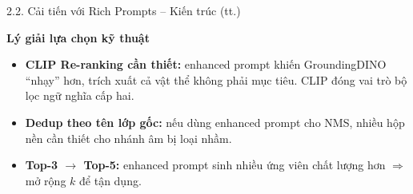 \documentclass[11pt]{beamer}
\begin{document}
\begin{frame}{2.2. Cải tiến với Rich Prompts -- Kiến trúc (tt.)}
\begin{block}{\textbf{Lý giải lựa chọn kỹ thuật}}
\begin{itemize}
  \item \textbf{CLIP Re-ranking cần thiết:} enhanced prompt khiến GroundingDINO ``nhạy'' hơn, trích xuất cả vật thể không phải mục tiêu. CLIP đóng vai trò bộ lọc ngữ nghĩa cấp hai.
  \item \textbf{Dedup theo tên lớp gốc:} nếu dùng enhanced prompt cho NMS, nhiều hộp nền cần thiết cho nhánh âm bị loại nhầm.
  \item \textbf{Top-3 $\to$ Top-5:} enhanced prompt sinh nhiều ứng viên chất lượng hơn $\Rightarrow$ mở rộng $k$ để tận dụng.
\end{itemize}
\end{block}

\end{frame}
\end{document}
